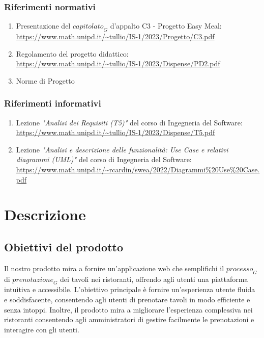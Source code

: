 \documentclass[12pt, oneside]{article}
\begin{document}
\subsubsection{Riferimenti normativi}
\begin{enumerate}
    \item Presentazione del $\textit{capitolato}_G$ d'appalto C3 - Progetto Easy Meal: \\ \url{https://www.math.unipd.it/~tullio/IS-1/2023/Progetto/C3.pdf}
    \item Regolamento del progetto didattico: \\ \url{https://www.math.unipd.it/~tullio/IS-1/2023/Dispense/PD2.pdf}
    \item Norme di Progetto
\end{enumerate}
\subsubsection{Riferimenti informativi}
\begin{enumerate}
    \item Lezione \emph{"Analisi dei Requisiti (T5)"} del corso di Ingegneria del Software: \\ \url{https://www.math.unipd.it/~tullio/IS-1/2023/Dispense/T5.pdf}
    \item Lezione \emph{"Analisi e descrizione delle funzionalità: Use Case e relativi diagrammi (UML)"} del corso di Ingegneria del Software: \\ \url{https://www.math.unipd.it/~rcardin/swea/2022/Diagrammi%20Use%20Case.pdf}
\end{enumerate}
\newpage

\section{Descrizione}
\subsection{Obiettivi del prodotto}
Il nostro prodotto mira a fornire un'applicazione web che semplifichi il $\textit{processo}_G$ di $\textit{prenotazione}_G$ dei tavoli nei ristoranti, offrendo agli utenti una piattaforma intuitiva e accessibile. L'obiettivo principale è fornire un'esperienza utente fluida e soddisfacente, consentendo agli utenti di prenotare tavoli in modo efficiente e senza intoppi. Inoltre, il prodotto mira a migliorare l'esperienza complessiva nei ristoranti consentendo agli amministratori di gestire facilmente le prenotazioni e interagire con gli utenti.
\end{document}
